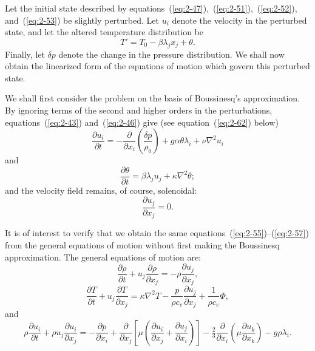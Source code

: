 Let the initial state described by equations~(\ref{eq:2-47}),~(\ref{eq:2-51}),~(\ref{eq:2-52}), and~(\ref{eq:2-53}) be
slightly perturbed. Let $u_i$ denote the velocity in the perturbed state,
and let the altered temperature distribution be
\begin{equation}
\label{eq:2-54}
T' = T_0 - \beta\lambda_j x_j + \theta.
\end{equation}
Finally, let $\delta p$ denote the change in the pressure distribution. We shall
now obtain the linearized form of the equations of motion which govern
this perturbed state.

We shall first consider the problem on the basis of Boussinesq's
approximation. By ignoring terms of the second and higher orders in the
perturbations, equations~(\ref{eq:2-43}) and~(\ref{eq:2-46}) give (see equation~(\ref{eq:2-62}) below)
\begin{equation}
\label{eq:2-55}
\frac{\partial u_i}{\partial t} = -\frac{\partial}{\partial x_i}\!\left(\frac{\delta p}{\rho_0}\right) + g\alpha\theta\lambda_i + \nu\nabla^2 u_i
\end{equation}
and
\begin{equation}
\label{eq:2-56}
\frac{\partial\theta}{\partial t} = \beta\lambda_j u_j + \kappa\nabla^2\theta;
\end{equation}
and the velocity field remains, of course, solenoidal:
\begin{equation}
\label{eq:2-57}
\frac{\partial u_j}{\partial x_j} = 0.
\end{equation}

It is of interest to verify that we obtain the same equations~(\ref{eq:2-55})--(\ref{eq:2-57})
from the general equations of motion without first making the Boussinesq approximation. The general equations of motion are:
\begin{equation}
\label{eq:2-58}
\frac{\partial\rho}{\partial t} + u_j\frac{\partial\rho}{\partial x_j} = -\rho\frac{\partial u_j}{\partial x_j},
\end{equation}
\begin{equation}
\label{eq:2-59}
\frac{\partial T}{\partial t} + u_j\frac{\partial T}{\partial x_j} = \kappa\nabla^2 T - \frac{p}{\rho c_v}\frac{\partial u_j}{\partial x_j} + \frac{1}{\rho c_v}\Phi,
\end{equation}
and
\begin{equation}
\label{eq:2-60}
\rho\frac{\partial u_i}{\partial t} + \rho u_j\frac{\partial u_i}{\partial x_j} = -\frac{\partial p}{\partial x_i} + \frac{\partial}{\partial x_j}\!\left[\mu\!\left(\frac{\partial u_i}{\partial x_j}+\frac{\partial u_j}{\partial x_i}\right)\right] - \tfrac{2}{3}\frac{\partial}{\partial x_i}\!\left(\mu\frac{\partial u_k}{\partial x_k}\right) - g\rho\lambda_i.
\end{equation}

